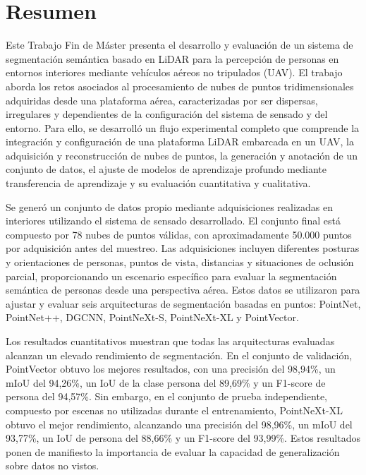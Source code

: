  \setcounter{page}{1}
\chapter*{Resumen}

Este Trabajo Fin de Máster presenta el desarrollo y evaluación de un sistema de segmentación semántica basado en LiDAR para la percepción de personas en entornos interiores mediante vehículos aéreos no tripulados (UAV). El trabajo aborda los retos asociados al procesamiento de nubes de puntos tridimensionales adquiridas desde una plataforma aérea, caracterizadas por ser dispersas, irregulares y dependientes de la configuración del sistema de sensado y del entorno. Para ello, se desarrolló un flujo experimental completo que comprende la integración y configuración de una plataforma LiDAR embarcada en un UAV, la adquisición y reconstrucción de nubes de puntos, la generación y anotación de un conjunto de datos, el ajuste de modelos de aprendizaje profundo mediante transferencia de aprendizaje y su evaluación cuantitativa y cualitativa.

Se generó un conjunto de datos propio mediante adquisiciones realizadas en interiores utilizando el sistema de sensado desarrollado. El conjunto final está compuesto por 78 nubes de puntos válidas, con aproximadamente 50.000 puntos por adquisición antes del muestreo. Las adquisiciones incluyen diferentes posturas y orientaciones de personas, puntos de vista, distancias y situaciones de oclusión parcial, proporcionando un escenario específico para evaluar la segmentación semántica de personas desde una perspectiva aérea. Estos datos se utilizaron para ajustar y evaluar seis arquitecturas de segmentación basadas en puntos: PointNet, PointNet++, DGCNN, PointNeXt-S, PointNeXt-XL y PointVector.

Los resultados cuantitativos muestran que todas las arquitecturas evaluadas alcanzan un elevado rendimiento de segmentación. En el conjunto de validación, PointVector obtuvo los mejores resultados, con una precisión del 98,94\%, un mIoU del 94,26\%, un IoU de la clase persona del 89,69\% y un F1-score de persona del 94,57\%. Sin embargo, en el conjunto de prueba independiente, compuesto por escenas no utilizadas durante el entrenamiento, PointNeXt-XL obtuvo el mejor rendimiento, alcanzando una precisión del 98,96\%, un mIoU del 93,77\%, un IoU de persona del 88,66\% y un F1-score del 93,99\%. Estos resultados ponen de manifiesto la importancia de evaluar la capacidad de generalización sobre datos no vistos.


